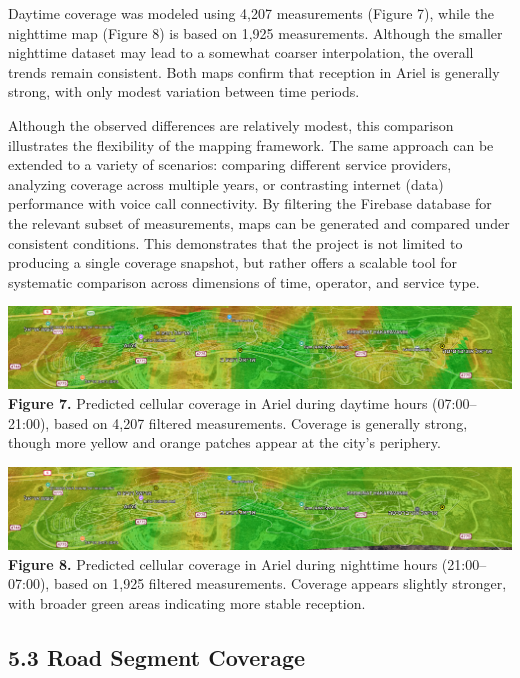 \documentclass[11pt]{article}
\begin{document}
Daytime coverage was modeled using 4,207 measurements (Figure 7), while
the nighttime map (Figure 8) is based on 1,925 measurements. Although
the smaller nighttime dataset may lead to a somewhat coarser
interpolation, the overall trends remain consistent. Both maps confirm
that reception in Ariel is generally strong, with only modest variation
between time periods.

Although the observed differences are relatively modest, this comparison
illustrates the flexibility of the mapping framework. The same approach
can be extended to a variety of scenarios: comparing different service
providers, analyzing coverage across multiple years, or contrasting
internet (data) performance with voice call connectivity. By filtering
the Firebase database for the relevant subset of measurements, maps can
be generated and compared under consistent conditions. This demonstrates
that the project is not limited to producing a single coverage snapshot,
but rather offers a scalable tool for systematic comparison across
dimensions of time, operator, and service type.

\includegraphics[width=1.0\textwidth]{figures/media/image9.png}\\
\textbf{Figure 7.} Predicted cellular coverage in Ariel during daytime
hours (07:00--21:00), based on 4,207 filtered measurements. Coverage is
generally strong, though more yellow and orange patches appear at the
city's periphery.

\includegraphics[width=1.0\textwidth]{figures/media/image5.png}\\
\textbf{Figure 8.} Predicted cellular coverage in Ariel during nighttime
hours (21:00--07:00), based on 1,925 filtered measurements. Coverage
appears slightly stronger, with broader green areas indicating more
stable reception.

\hypertarget{road-segment-coverage}{%
\subsection{5.3 Road Segment Coverage}\label{road-segment-coverage}}
\end{document}
